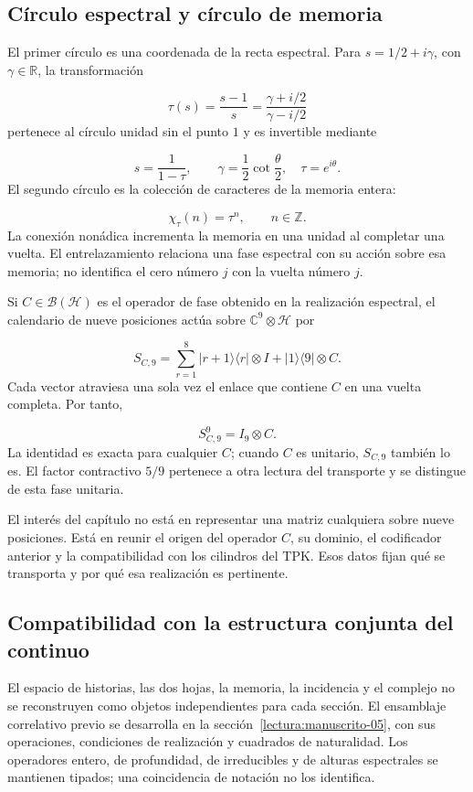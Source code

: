 \subsection{Círculo espectral y círculo de memoria}
El primer círculo es una coordenada de la recta espectral. Para $s=1/2+i\gamma$, con \(\gamma\in\mathbb R\), la transformación

\[
\tau(s)=\frac{s-1}{s}
=\frac{\gamma+i/2}{\gamma-i/2}
\]
pertenece al círculo unidad sin el punto \(1\) y es invertible mediante

\[
s=\frac1{1-\tau},\qquad
\gamma=\frac12\cot\frac{\theta}{2},\quad\tau=e^{i\theta}.
\]
El segundo círculo es la colección de caracteres de la memoria entera:

\[
\chi_\tau(n)=\tau^n,\qquad n\in\mathbb Z.
\]
La conexión nonádica incrementa la memoria en una unidad al completar una vuelta. El entrelazamiento relaciona una fase espectral con su acción sobre esa memoria; no identifica el cero número $j$ con la vuelta número $j$.

Si \(C\in\mathcal B(\mathcal H)\) es el operador de fase obtenido en la realización espectral, el calendario de nueve posiciones actúa sobre \(\mathbb C^9\otimes\mathcal H\) por

\[
S_{C,9}=\sum_{r=1}^8|r+1\rangle\langle r|\otimes I
+|1\rangle\langle9|\otimes C.
\]
Cada vector atraviesa una sola vez el enlace que contiene $C$ en una vuelta completa. Por tanto,

\[
S_{C,9}^9=I_9\otimes C.
\]
La identidad es exacta para cualquier $C$; cuando $C$ es unitario, $S_{C,9}$ también lo es. El factor contractivo $5/9$ pertenece a otra lectura del transporte y se distingue de esta fase unitaria.

El interés del capítulo no está en representar una matriz cualquiera sobre nueve posiciones. Está en reunir el origen del operador $C$, su dominio, el codificador anterior y la compatibilidad con los cilindros del TPK. Esos datos fijan qué se transporta y por qué esa realización es pertinente.

\subsection{Compatibilidad con la estructura conjunta del continuo}
El espacio de historias, las dos hojas, la memoria, la incidencia y el complejo no se reconstruyen como objetos independientes para cada sección. El ensamblaje correlativo previo se desarrolla en la sección~\ref{lectura:manuscrito-05}, con sus operaciones, condiciones de realización y cuadrados de naturalidad. Los operadores entero, de profundidad, de irreducibles y de alturas espectrales se mantienen tipados; una coincidencia de notación no los identifica.

